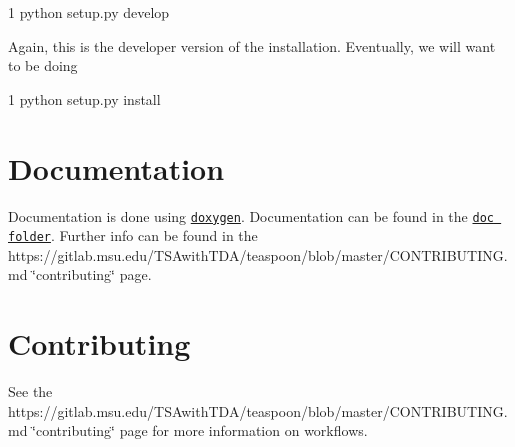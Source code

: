 \begin{DoxyCode}
1 python setup.py develop
\end{DoxyCode}


Again, this is the developer version of the installation. Eventually, we will want to be doing


\begin{DoxyCode}
1 python setup.py install
\end{DoxyCode}


\section*{Documentation }

Documentation is done using \href{http://www.doxygen.org}{\tt doxygen}. Documentation can be found in the \href{https://gitlab.msu.edu/TSAwithTDA/teaspoon/doc/html/index.html}{\tt doc folder}. Further info can be found in the https\+://gitlab.msu.\+edu/\+T\+S\+Awith\+T\+D\+A/teaspoon/blob/master/\+C\+O\+N\+T\+R\+I\+B\+U\+T\+I\+NG.md \char`\"{}contributing\char`\"{} page.

\section*{Contributing }

See the https\+://gitlab.msu.\+edu/\+T\+S\+Awith\+T\+D\+A/teaspoon/blob/master/\+C\+O\+N\+T\+R\+I\+B\+U\+T\+I\+NG.md \char`\"{}contributing\char`\"{} page for more information on workflows. 